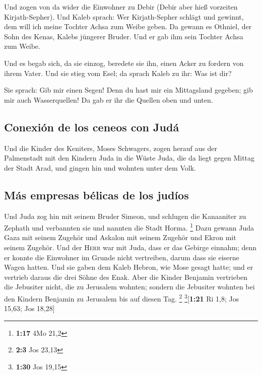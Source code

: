  Und zogen von da wider die Einwohner zu Debir (Debir
aber hieß vorzeiten Kirjath-Sepher).  Und Kaleb sprach:
Wer Kirjath-Sepher schlägt und gewinnt, dem will ich meine Tochter Achsa
zum Weibe geben.  Da gewann es Othniel, der Sohn des
Kenas, Kalebs jüngerer Bruder. Und er gab ihm sein Tochter Achsa zum
Weibe.

 Und es begab sich, da sie einzog, beredete sie ihn,
einen Acker zu fordern von ihrem Vater. Und sie stieg vom Esel; da
sprach Kaleb zu ihr: Was ist dir?

 Sie sprach: Gib mir einen Segen! Denn du hast mir ein
Mittagsland gegeben; gib mir auch Wasserquellen! Da gab er ihr die
Quellen oben und unten.

\hypertarget{conexiuxf3n-de-los-ceneos-con-juduxe1}{%
\subsection{Conexión de los ceneos con
Judá}\label{conexiuxf3n-de-los-ceneos-con-juduxe1}}

 Und die Kinder des Keniters, Moses Schwagers, zogen
herauf aus der Palmenstadt mit den Kindern Juda in die Wüste Juda, die
da liegt gegen Mittag der Stadt Arad, und gingen hin und wohnten unter
dem Volk.

\hypertarget{muxe1s-empresas-buxe9licas-de-los-juduxedos}{%
\subsection{Más empresas bélicas de los
judíos}\label{muxe1s-empresas-buxe9licas-de-los-juduxedos}}

 Und Juda zog hin mit seinem Bruder Simeon, und schlugen
die Kanaaniter zu Zephath und verbannten sie und nannten die Stadt
Horma. \footnote{\textbf{1:17} 4Mo 21,2}  Dazu gewann
Juda Gaza mit seinem Zugehör und Askalon mit seinem Zugehör und Ekron
mit seinem Zugehör.  Und der \textsc{Herr} war mit Juda,
dass er das Gebirge einnahm; denn er konnte die Einwohner im Grunde
nicht vertreiben, darum dass sie eiserne Wagen hatten. 
Und sie gaben dem Kaleb Hebron, wie Mose gesagt hatte; und er vertrieb
daraus die drei Söhne des Enak.  Aber die Kinder Benjamin
vertrieben die Jebusiter nicht, die zu Jerusalem wohnten; sondern die
Jebusiter wohnten bei den Kindern Benjamin zu Jerusalem bis auf diesen
Tag. \footnote{\textbf{2:3} Jos 23,13} \footnote{\textbf{1:30} Jos 19,15}{[}\textbf{1:21}
Ri 1,8; Jos 15,63; Jos 18,28{]}

